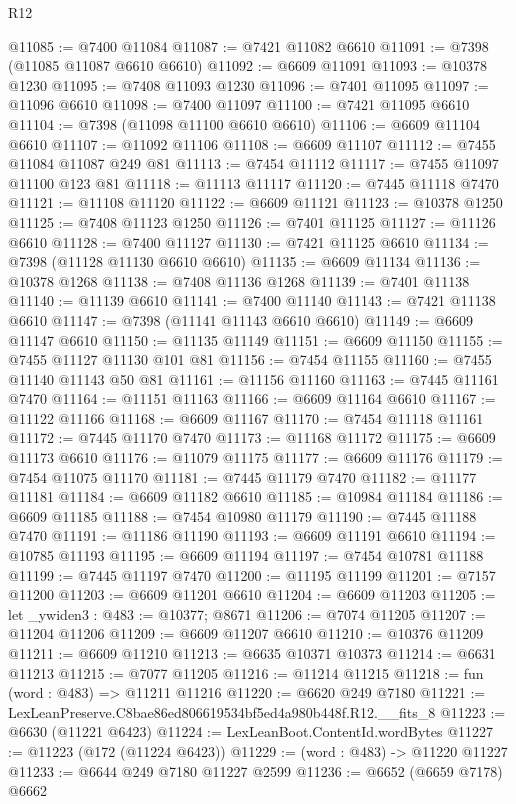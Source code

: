 \begin{lexlean}{R12}
\begin{coremodule}
@11085 := @7400 @11084
@11087 := @7421 @11082 @6610
@11091 := @7398 (@11085 @11087 @6610 @6610)
@11092 := @6609 @11091
@11093 := @10378 @1230
@11095 := @7408 @11093 @1230
@11096 := @7401 @11095
@11097 := @11096 @6610
@11098 := @7400 @11097
@11100 := @7421 @11095 @6610
@11104 := @7398 (@11098 @11100 @6610 @6610)
@11106 := @6609 @11104 @6610
@11107 := @11092 @11106
@11108 := @6609 @11107
@11112 := @7455 @11084 @11087 @249 @81
@11113 := @7454 @11112
@11117 := @7455 @11097 @11100 @123 @81
@11118 := @11113 @11117
@11120 := @7445 @11118 @7470
@11121 := @11108 @11120
@11122 := @6609 @11121
@11123 := @10378 @1250
@11125 := @7408 @11123 @1250
@11126 := @7401 @11125
@11127 := @11126 @6610
@11128 := @7400 @11127
@11130 := @7421 @11125 @6610
@11134 := @7398 (@11128 @11130 @6610 @6610)
@11135 := @6609 @11134
@11136 := @10378 @1268
@11138 := @7408 @11136 @1268
@11139 := @7401 @11138
@11140 := @11139 @6610
@11141 := @7400 @11140
@11143 := @7421 @11138 @6610
@11147 := @7398 (@11141 @11143 @6610 @6610)
@11149 := @6609 @11147 @6610
@11150 := @11135 @11149
@11151 := @6609 @11150
@11155 := @7455 @11127 @11130 @101 @81
@11156 := @7454 @11155
@11160 := @7455 @11140 @11143 @50 @81
@11161 := @11156 @11160
@11163 := @7445 @11161 @7470
@11164 := @11151 @11163
@11166 := @6609 @11164 @6610
@11167 := @11122 @11166
@11168 := @6609 @11167
@11170 := @7454 @11118 @11161
@11172 := @7445 @11170 @7470
@11173 := @11168 @11172
@11175 := @6609 @11173 @6610
@11176 := @11079 @11175
@11177 := @6609 @11176
@11179 := @7454 @11075 @11170
@11181 := @7445 @11179 @7470
@11182 := @11177 @11181
@11184 := @6609 @11182 @6610
@11185 := @10984 @11184
@11186 := @6609 @11185
@11188 := @7454 @10980 @11179
@11190 := @7445 @11188 @7470
@11191 := @11186 @11190
@11193 := @6609 @11191 @6610
@11194 := @10785 @11193
@11195 := @6609 @11194
@11197 := @7454 @10781 @11188
@11199 := @7445 @11197 @7470
@11200 := @11195 @11199
@11201 := @7157 @11200
@11203 := @6609 @11201 @6610
@11204 := @6609 @11203
@11205 := let _ywiden3 : @483 := @10377; @8671
@11206 := @7074 @11205
@11207 := @11204 @11206
@11209 := @6609 @11207 @6610
@11210 := @10376 @11209
@11211 := @6609 @11210
@11213 := @6635 @10371 @10373
@11214 := @6631 @11213
@11215 := @7077 @11205
@11216 := @11214 @11215
@11218 := fun (word : @483) => @11211 @11216
@11220 := @6620 @249 @7180
@11221 := LexLeanPreserve.C8bae86ed806619534bf5ed4a980b448f.R12.__fits_8
@11223 := @6630 (@11221 @6423)
@11224 := LexLeanBoot.ContentId.wordBytes
@11227 := @11223 (@172 (@11224 @6423))
@11229 := (word : @483) -> @11220 @11227
@11233 := @6644 @249 @7180 @11227 @2599
@11236 := @6652 (@6659 @7178) @6662

\end{coremodule}
\end{lexlean}
